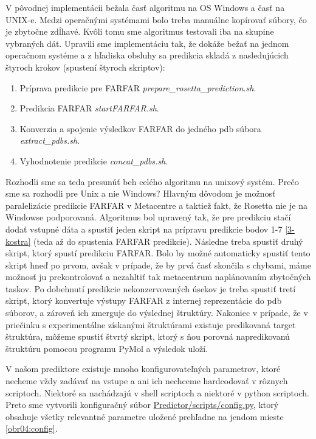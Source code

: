 \indent V pôvodnej implementácii bežala časť algoritmu na OS Windows a časť na UNIX-e. Medzi operačnými systémami bolo treba manuálne kopírovať súbory, čo je zbytočne zdĺhavé. Kvôli tomu sme algoritmus testovali iba na skupine vybraných dát. Upravili sme implementáciu tak, že dokáže bežať na jednom operačnom systéme a z hľadiska obsluhy sa predikcia skladá z nasledujúcich štyroch krokov (spustení štyroch skriptov):
\begin{enumerate}
\item Príprava predikcie pre FARFAR \textit{prepare\_rosetta\_prediction.sh}.
\item Predikcia FARFAR \textit{startFARFAR.sh}.
\item Konverzia a spojenie výsledkov FARFAR do jedného pdb súbora \textit{extract\_pdbs.sh}.
\item Vyhodnotenie predikcie \textit{concat\_pdbs.sh}.
\end{enumerate}

\indent Rozhodli sme sa teda presunúť beh celého algoritmu na unixový systém. Prečo sme sa rozhodli pre Unix a nie Windows? Hlavným dôvodom je možnosť paralelizácie predikcie FARFAR v Metacentre a taktiež fakt, že Rosetta nie je na Windowse podporovaná. Algoritmus bol upravený tak, že pre predikciu stačí dodať vstupné dáta a spustiť jeden skript na prípravu predikcie bodov 1-7 \autoref{3-kostra} (teda až do spustenia FARFAR predikcie). Následne treba spustiť druhý skript, ktorý spustí predikciu FARFAR. Bolo by možné automaticky spustiť tento skript hneď po prvom, avšak v prípade, že by prvá časť skončila s chybami, máme možnosť ju prekontrolovať a nezahltiť tak metacentrum naplánovaním zbytočných taskov. Po dobehnutí predikcie nekonzervovaných úsekov je treba spustiť tretí skript, ktorý konvertuje výstupy FARFAR z internej reprezentácie do pdb súborov, a zároveň ich zmerguje do výslednej štruktúry. Nakoniec v prípade, že v priečinku s experimentálne získanými štruktúrami existuje predikovaná target štruktúra, môžeme spustiť štvrtý skript, ktorý s ňou porovná napredikovanú štruktúru pomocou programu PyMol a výsledok uloží.


\indent V našom prediktore existuje mnoho konfigurovateľných parametrov, ktoré necheme vždy zadávať na vstupe a ani ich nechceme hardcodovať v rôznych scriptoch. Niektoré sa nachádzajú v shell scriptoch a niektoré v python scriptoch. Preto sme vytvorili konfiguračný súbor \url{Predictor/scripts/config.py}, ktorý obsahuje všetky relevantné parametre uložené prehľadne na jendom mieste \autoref{obr04:config}.


